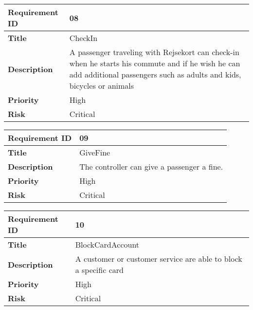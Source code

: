 \begin{center}
	\def\arraystretch{1.5}%
    \begin{tabular}{ | p{5cm} | p{5cm} |}
    \hline
    	\textbf{Requirement ID} & 08 \\ \hline
		\textbf{Title} & CheckIn\\ \hline
		\textbf{Description} & A passenger traveling with Rejsekort can check-in when he starts his commute and if he wish he can add additional passengers such as adults and kids, bicycles or animals\\ \hline
		\textbf{Priority} & High\\ \hline
		\textbf{Risk} & Critical\\
      \hline
    \end{tabular}
\end{center}

\begin{center}
	\def\arraystretch{1.5}%
    \begin{tabular}{ | p{5cm} | p{5cm} |}
    \hline
    	\textbf{Requirement ID} & 09 \\ \hline
		\textbf{Title} & GiveFine\\ \hline
		\textbf{Description} & The controller can give a passenger a fine.\\ \hline
		\textbf{Priority} & High\\ \hline
		\textbf{Risk} & Critical\\
      \hline
    \end{tabular}
\end{center}

\begin{center}
	\def\arraystretch{1.5}%
    \begin{tabular}{ | p{5cm} | p{5cm} |}
    \hline
    	\textbf{Requirement ID} & 10 \\ \hline
		\textbf{Title} & BlockCardAccount\\ \hline
		\textbf{Description} & A customer or customer service are able to block a specific card\\ \hline
		\textbf{Priority} & High\\ \hline
		\textbf{Risk} & Critical\\
      \hline
    \end{tabular}
\end{center}

